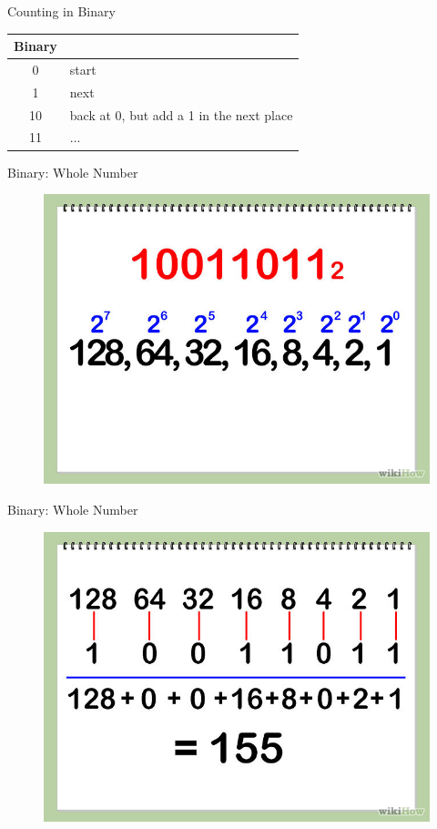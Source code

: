 \documentclass[xcolor={dvipsnames}]{beamer}
\begin{document}
\begin{frame}{Counting in Binary}
	\begin{center}
	\begin{tabular}{c | l}
		Binary & \\
		\hline
		0 & start\\
		1 & next \\
		10 & back at 0, but add a 1 in the next place\\
		11 & ...
	\end{tabular}
	\end{center}
\end{frame}

\begin{frame}{Binary: Whole Number}
	\begin{figure}
		\href{http://www.wikihow.com/Convert-from-Binary-to-Decimal}{\includegraphics[width=1\textwidth]{binary_decimal}}
	\end{figure}
\end{frame}

\begin{frame}{Binary: Whole Number}
	\begin{figure}
		\href{http://www.wikihow.com/Convert-from-Binary-to-Decimal}{\includegraphics[width=1\textwidth]{binary_decimal_2}}
	\end{figure}
\end{frame}
\end{document}
